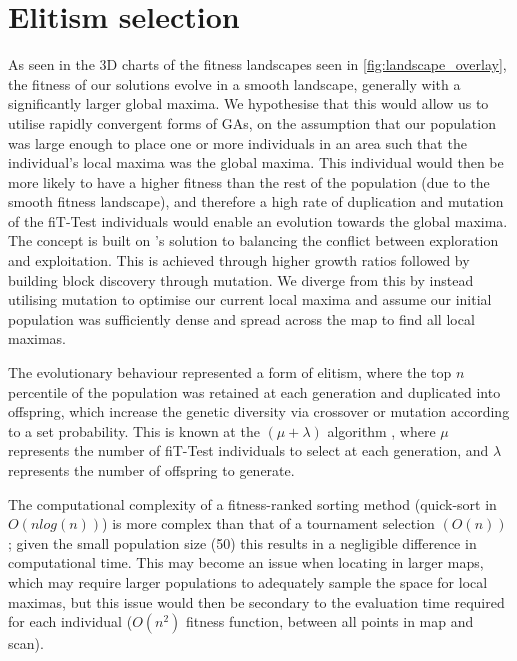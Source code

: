 \documentclass[authoryearcitations]{UoYCSproject}
\begin{document}
\section{Elitism selection}
\label{subsec:elitism_sel}
As seen in the 3D charts of the fitness landscapes seen in \autoref{fig:landscape_overlay}, the fitness of our solutions evolve in a smooth landscape, generally with a significantly larger global maxima. We hypothesise that this would allow us to utilise rapidly convergent forms of GAs, on the assumption that our population was large enough to place one or more individuals in an area such that the individual's local maxima was the global maxima. This individual would then be more likely to have a higher fitness than the rest of the population (due to the smooth fitness landscape), and therefore a high rate of duplication and mutation of the fiT-Test individuals would enable an evolution towards the global maxima. The concept is built on \citet{David_E_Goldberg1991-es}'s solution to balancing the conflict between exploration and exploitation. This is achieved through higher growth ratios followed by building block discovery through mutation. We diverge from this by instead utilising mutation to optimise our current local maxima  and assume our initial population was sufficiently dense and spread across the map to find all local maximas. \newline
	
The evolutionary behaviour represented a form of elitism, where the top $n$ percentile of the population was retained at each generation and duplicated into offspring, which increase the genetic diversity via crossover or mutation according to a set probability. This is known at the $(\mu + \lambda)$  algorithm \cite{T_Back_D_B_Fogel_T_Michalewicz} \cite{Shapiro1992-qm}, where $\mu$ represents the number of fiT-Test individuals to select at each generation, and $\lambda$ represents the number of offspring to generate. \newline 


The computational complexity of a fitness-ranked sorting method (quick-sort in $O(n log (n))$) is more complex  \cite{Mitchell1998-td} than that of a tournament selection $(O(n))$ \cite{David_E_Goldberg1991-es}; given the small population size (50) this results in a negligible difference in computational time. This may become an issue when locating in larger maps, which may require larger populations to adequately sample the space for local maximas, but this issue would then be secondary to the evaluation time required for each individual ($O(n^2)$  fitness function, between all points in map and scan).
\end{document}
